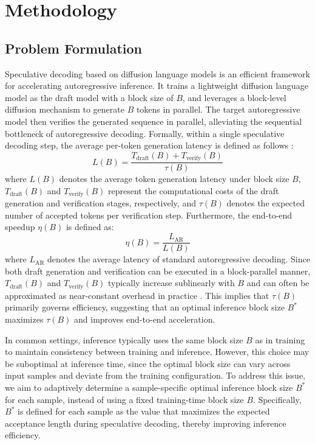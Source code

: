 \documentclass{llmxive}
\begin{document}
\section{Methodology}
\subsection{Problem Formulation}
Speculative decoding based on diffusion language models \cite{li2025diffuspecunlockingdiffusionlanguage,sandler2025specdiff2scalingdiffusiondrafter,samragh2025llmknowsfutureuncovering,chen2026dflash} is an efficient framework for accelerating autoregressive inference. It trains a lightweight diffusion language model as the draft model with a block size of $B$, and leverages a block-level diffusion mechanism to generate $B$ tokens in parallel. The target autoregressive model then verifies the generated sequence in parallel, alleviating the sequential bottleneck of autoregressive decoding. Formally, within a single speculative decoding step, the average per-token generation latency is defined as follows \cite{chen2026dflash}:
\begin{equation}
L(B) = \frac{T_{\text{draft}}(B) + T_{\text{verify}}(B)}{\tau(B)}
\end{equation}
where $L(B)$ denotes the average token generation latency under block size $B$, $T_{\text{draft}}(B)$ and $T_{\text{verify}}(B)$ represent the computational costs of the draft generation and verification stages, respectively, and $\tau(B)$ denotes the expected number of accepted tokens per verification step. Furthermore, the end-to-end speedup $\eta(B)$ is defined as:
\begin{equation}
\eta(B) = \frac{L_{\text{AR}}}{L(B)}
\end{equation}
where $L_{\text{AR}}$ denotes the average latency of standard autoregressive decoding. Since both draft generation and verification can be executed in a block-parallel manner, $T_{\text{draft}}(B)$ and $T_{\text{verify}}(B)$ typically increase sublinearly with $B$ and can often be approximated as near-constant overhead in practice \cite{hooper2025speed,stern2018blockwise,santilli2023accelerating}. This implies that $\tau(B)$ primarily governs efficiency, suggesting that an optimal inference block size $B^*$ maximizes $\tau(B)$ and improves end-to-end acceleration.

In common settings, inference typically uses the same block size $B$ as in training to maintain consistency between training and inference. However, this choice may be suboptimal at inference time, since the optimal block size can vary across input samples and deviate from the training configuration. To address this issue, we aim to adaptively determine a sample-specific optimal inference block size $B^*$ for each sample, instead of using a fixed training-time block size $B$. Specifically, $B^*$ is defined for each sample as the value that maximizes the expected acceptance length during speculative decoding, thereby improving inference efficiency.
\end{document}

